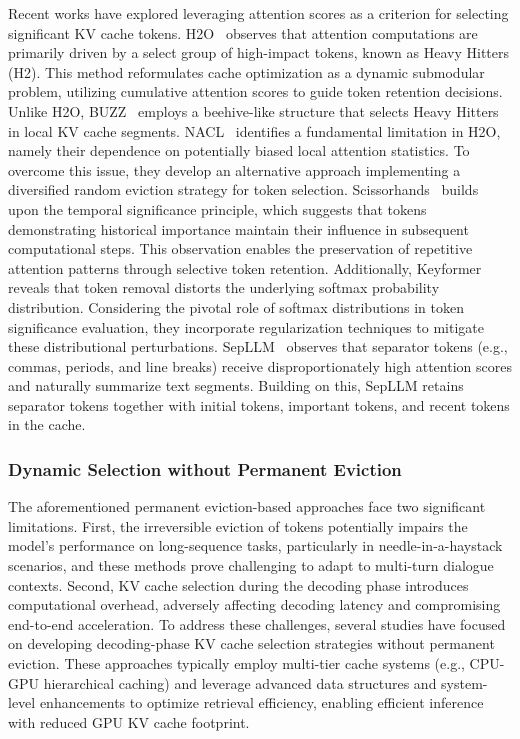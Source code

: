 Recent works have explored leveraging attention scores as a criterion for 
selecting significant KV cache tokens.
H2O~\cite{DBLP:conf/nips/Zhang00CZC0TRBW23} observes that attention computations are primarily 
driven by a select group of high-impact tokens, known as Heavy Hitters (H2). This method reformulates 
cache optimization as a dynamic submodular problem, utilizing cumulative attention scores 
to guide token retention decisions.
Unlike H2O, BUZZ~\cite{zhao2024buzzbeehivestructuredsparsekv} employs a beehive-like structure that 
selects Heavy Hitters in local KV cache segments.
NACL~\cite{DBLP:journals/corr/abs-2408-03675} identifies a fundamental limitation in H2O, 
namely their dependence on potentially biased local attention statistics. To overcome this issue, 
they develop an alternative approach implementing a diversified random eviction strategy for token 
selection.
Scissorhands~\cite{DBLP:conf/nips/LiuDLWXXKS23} builds upon the temporal significance principle, 
which suggests that tokens demonstrating historical importance maintain their influence in subsequent 
computational steps. This observation enables the preservation of repetitive attention patterns through 
selective token retention.
Additionally, Keyformer~\cite{DBLP:conf/mlsys/AdnanAJNSK24} reveals that token removal distorts the underlying softmax probability distribution. 
Considering the pivotal role of softmax distributions in token significance evaluation, 
they incorporate regularization techniques to mitigate these distributional perturbations.
SepLLM~\cite{chen2024sepllm} observes that separator tokens (e.g., commas, periods, and line breaks) receive disproportionately high attention scores and naturally summarize text segments. Building on this, SepLLM retains separator tokens together with initial tokens, important tokens, and recent tokens in the cache.

\subsubsection{Dynamic Selection without Permanent Eviction}\label{sssec:dynamic_kv_no_permanent}

The aforementioned permanent eviction-based approaches face two significant limitations. 
First, the irreversible eviction of tokens potentially impairs the model's performance on 
long-sequence tasks, particularly in needle-in-a-haystack scenarios, and these methods prove 
challenging to adapt to multi-turn dialogue contexts. Second, KV cache selection during the 
decoding phase introduces computational overhead, adversely affecting decoding latency and 
compromising end-to-end acceleration.
To address these challenges, several studies have focused on developing decoding-phase KV 
cache selection strategies without permanent eviction. These approaches typically employ 
multi-tier cache systems (e.g., CPU-GPU hierarchical caching) and leverage advanced data 
structures and system-level enhancements to optimize retrieval efficiency, enabling 
efficient inference with reduced GPU KV cache footprint.


